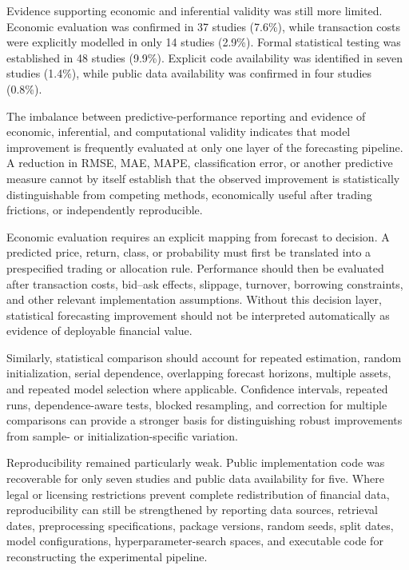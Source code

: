 \documentclass[pdflatex,sn-mathphys-num]{sn-jnl}%
\theoremstyle{thmstyleone}%
\theoremstyle{thmstyletwo}%
\theoremstyle{thmstylethree}%
\begin{document}
Evidence supporting economic and inferential validity was still more limited.
Economic evaluation
\cite{P00050,P00056,P00098,P00107,P00117,P00144,P00157,P00160}
was confirmed in 37 studies (7.6\%), while transaction costs
\cite{P00037,P00050,P00056,P00120,P00293,P00435,P00471,P00571}
were explicitly modelled in only 14 studies (2.9\%). Formal statistical
testing
\cite{P00030,P00037,P00050,P00071,P00083,P00089,P00149,P00154}
was established in 48 studies (9.9\%). Explicit code availability
\cite{P00037,P00089,P00176,P00451,P00834,P01193,P03277}
was identified in seven studies (1.4\%), while public data availability
was confirmed in four studies (0.8\%).

The imbalance between predictive-performance reporting and evidence of
economic, inferential, and computational validity indicates that model
improvement is frequently evaluated at only one layer of the forecasting
pipeline. A reduction in RMSE, MAE, MAPE, classification error, or another
predictive measure cannot by itself establish that the observed improvement
is statistically distinguishable from competing methods, economically useful
after trading frictions, or independently reproducible.

Economic evaluation requires an explicit mapping from forecast to decision.
A predicted price, return, class, or probability must first be translated
into a prespecified trading or allocation rule. Performance should then be
evaluated after transaction costs, bid--ask effects, slippage, turnover,
borrowing constraints, and other relevant implementation assumptions.
Without this decision layer, statistical forecasting improvement should not
be interpreted automatically as evidence of deployable financial value.

Similarly, statistical comparison should account for repeated estimation,
random initialization, serial dependence, overlapping forecast horizons,
multiple assets, and repeated model selection where applicable.
Confidence intervals, repeated runs, dependence-aware tests, blocked
resampling, and correction for multiple comparisons can provide a stronger
basis for distinguishing robust improvements from sample- or
initialization-specific variation.

Reproducibility remained particularly weak. Public implementation code was
recoverable for only seven studies and public data availability for five.
Where legal or licensing restrictions prevent complete redistribution of
financial data, reproducibility can still be strengthened by reporting data
sources, retrieval dates, preprocessing specifications, package versions,
random seeds, split dates, model configurations, hyperparameter-search
spaces, and executable code for reconstructing the experimental pipeline.
\end{document}
